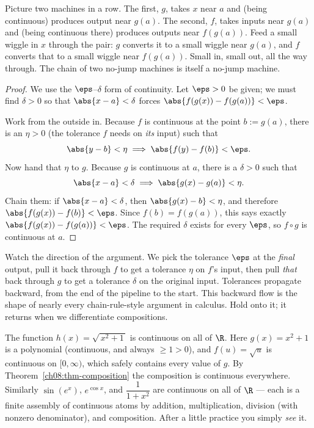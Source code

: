 \begin{intuitionbox}
Picture two machines in a row. The first, $g$, takes $x$ near $a$ and (being continuous)
produces output near $g(a)$. The second, $f$, takes inputs near $g(a)$ and (being
continuous there) produces outputs near $f(g(a))$. Feed a small wiggle in $x$ through the
pair: $g$ converts it to a small wiggle near $g(a)$, and $f$ converts that to a small
wiggle near $f(g(a))$. Small in, small out, all the way through. The chain of two no-jump
machines is itself a no-jump machine.
\end{intuitionbox}

\begin{proof}
We use the $\eps$--$\delta$ form of continuity. Let $\eps>0$ be given; we must find
$\delta>0$ so that $\abs{x-a}<\delta$ forces $\abs{f(g(x))-f(g(a))}<\eps$.

Work from the outside in. Because $f$ is continuous at the point $b:=g(a)$, there is an
$\eta>0$ (the tolerance $f$ needs on \emph{its} input) such that
\[
  \abs{y-b}<\eta \implies \abs{f(y)-f(b)}<\eps.
\]
Now hand that $\eta$ to $g$. Because $g$ is continuous at $a$, there is a $\delta>0$ such
that
\[
  \abs{x-a}<\delta \implies \abs{g(x)-g(a)}<\eta.
\]
Chain them: if $\abs{x-a}<\delta$, then $\abs{g(x)-b}<\eta$, and therefore
$\abs{f(g(x))-f(b)}<\eps$. Since $f(b)=f(g(a))$, this says exactly
$\abs{f(g(x))-f(g(a))}<\eps$. The required $\delta$ exists for every $\eps$, so $f\circ g$
is continuous at $a$.
\end{proof}

\begin{focusbox}
Watch the direction of the argument. We pick the tolerance $\eps$ at the \emph{final}
output, pull it back through $f$ to get a tolerance $\eta$ on $f$'s input, then pull
\emph{that} back through $g$ to get a tolerance $\delta$ on the original input. Tolerances
propagate backward, from the end of the pipeline to the start. This backward flow is the
shape of nearly every chain-rule-style argument in calculus. Hold onto it; it returns when
we differentiate compositions.
\end{focusbox}

\begin{example}
\label{ch08:ex-glance}
The function $h(x)=\sqrt{\,x^2+1\,}$ is continuous on all of $\R$. Here $g(x)=x^2+1$ is a
polynomial (continuous, and always $\ge 1>0$), and $f(u)=\sqrt{u}$ is continuous on
$[0,\infty)$, which safely contains every value of $g$. By
Theorem~\ref{ch08:thm-composition} the composition is continuous everywhere. Similarly
$\sin(e^x)$, $e^{\cos x}$, and $\dfrac{1}{1+x^2}$ are continuous on all of $\R$ --- each is
a finite assembly of continuous atoms by addition, multiplication, division (with nonzero
denominator), and composition. After a little practice you simply \emph{see} it.
\end{example}

